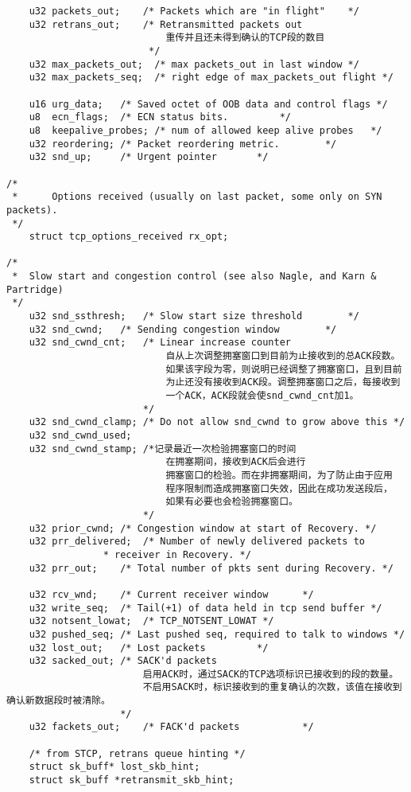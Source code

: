 \begin{verbatim}
    u32 packets_out;    /* Packets which are "in flight"    */
    u32 retrans_out;    /* Retransmitted packets out       
							重传并且还未得到确认的TCP段的数目
						 */
    u32 max_packets_out;  /* max packets_out in last window */
    u32 max_packets_seq;  /* right edge of max_packets_out flight */

    u16 urg_data;   /* Saved octet of OOB data and control flags */
    u8  ecn_flags;  /* ECN status bits.         */
    u8  keepalive_probes; /* num of allowed keep alive probes   */
    u32 reordering; /* Packet reordering metric.        */
    u32 snd_up;     /* Urgent pointer       */

/*
 *      Options received (usually on last packet, some only on SYN packets).
 */
    struct tcp_options_received rx_opt;

/*
 *  Slow start and congestion control (see also Nagle, and Karn & Partridge)
 */
    u32 snd_ssthresh;   /* Slow start size threshold        */
    u32 snd_cwnd;   /* Sending congestion window        */
    u32 snd_cwnd_cnt;   /* Linear increase counter      
							自从上次调整拥塞窗口到目前为止接收到的总ACK段数。
							如果该字段为零，则说明已经调整了拥塞窗口，且到目前
							为止还没有接收到ACK段。调整拥塞窗口之后，每接收到
							一个ACK，ACK段就会使snd_cwnd_cnt加1。
						*/
    u32 snd_cwnd_clamp; /* Do not allow snd_cwnd to grow above this */
    u32 snd_cwnd_used;
    u32 snd_cwnd_stamp;	/*记录最近一次检验拥塞窗口的时间
							在拥塞期间，接收到ACK后会进行
							拥塞窗口的检验。而在非拥塞期间，为了防止由于应用
							程序限制而造成拥塞窗口失效，因此在成功发送段后，
							如果有必要也会检验拥塞窗口。
						*/
    u32 prior_cwnd; /* Congestion window at start of Recovery. */
    u32 prr_delivered;  /* Number of newly delivered packets to
                 * receiver in Recovery. */
    u32 prr_out;    /* Total number of pkts sent during Recovery. */

    u32 rcv_wnd;    /* Current receiver window      */
    u32 write_seq;  /* Tail(+1) of data held in tcp send buffer */
    u32 notsent_lowat;  /* TCP_NOTSENT_LOWAT */
    u32 pushed_seq; /* Last pushed seq, required to talk to windows */
    u32 lost_out;   /* Lost packets         */
    u32 sacked_out; /* SACK'd packets           
						启用ACK时，通过SACK的TCP选项标识已接收到的段的数量。
						不启用SACK时，标识接收到的重复确认的次数，该值在接收到确认新数据段时被清除。
					*/
    u32 fackets_out;    /* FACK'd packets           */

    /* from STCP, retrans queue hinting */
    struct sk_buff* lost_skb_hint;
    struct sk_buff *retransmit_skb_hint;


\end{verbatim}
